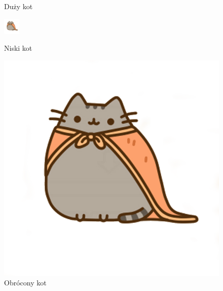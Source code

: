 \documentclass{article}
\begin{document}
\begin{figure}
	\caption{Duży kot}
	\endminipage\hfill
	\includegraphics[width=\linewidth,height=30px]{cat.png}
	\caption{Niski kot}
	\endminipage\hfill
	\includegraphics[width=\linewidth,angle=20]{cat.png}
	\caption{Obrócony kot}
	\endminipage\hfill
\end{figure}
\end{document}
